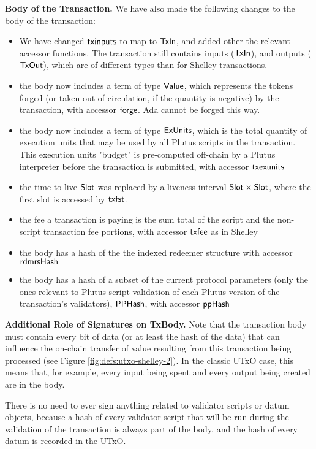 \textbf{Body of the Transaction.}
We have also made the following changes to
the body of the transaction:

\begin{itemize}

  \item We have changed $\mathsf{txinputs}$ to map to $\mathsf{TxIn}$, and added other the relevant
  accessor functions. The transaction still contains inputs ($\mathsf{TxIn}$), and
  outputs ($\mathsf{TxOut}$), which are of different types than for Shelley transactions.
  \item the body now includes a term of type $\mathsf{Value}$, which represents
  the tokens forged (or taken out of circulation, if the quantity is negative)
  by the transaction,
  with accessor $\mathsf{forge}$. Ada cannot be forged this way.
  \item the body now includes a term of type $\mathsf{ExUnits}$, which is the total quantity of execution units
  that may be used by all Plutus scripts in the transaction.
  This execution units "budget" is pre-computed off-chain by a Plutus interpreter
  before the transaction is submitted, with accessor $\mathsf{txexunits}$
  \item the
  time to live $\mathsf{Slot}$ was replaced by a liveness interval $\mathsf{Slot} \times \mathsf{Slot}$,
  where the first slot is accessed by $\mathsf{txfst}$.
  \item the fee a transaction is paying is the sum total of the script and the
  non-script transaction fee portions, with accessor $\mathsf{txfee}$ as in Shelley
  \item the body has a hash of the the indexed redeemer structure
  with accessor $\mathsf{rdmrsHash}$
  \item the body has a hash of a subset of the current protocol parameters
  (only the ones relevant to Plutus script validation of each Plutus
  version of the transaction's validators), $\mathsf{PPHash}$, with accessor $\mathsf{ppHash}$
\end{itemize}

\textbf{Additional Role of Signatures on TxBody.}
Note that the transaction body must contain every bit of data
(or at least the hash of the data) that can influence the
on-chain transfer of value resulting from this transaction being processed
(see Figure \ref{fig:defs:utxo-shelley-2}).
In the classic UTxO case, this means that, for example,
every input being spent and every output being created are in the body.

There is no need to ever sign anything related to validator scripts or datum objects,
because a hash of every validator script that will be run during the validation
of the transaction is always part of the body, and the hash of every datum
is recorded in the UTxO.

